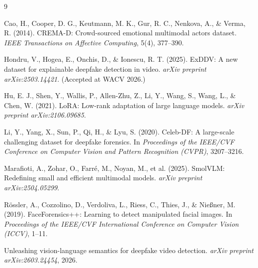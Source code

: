 \documentclass[acmsmall,review=false]{acmart}
\begin{document}
\begin{thebibliography}{9}

Cao, H., Cooper, D. G., Keutmann, M. K., Gur, R. C., Nenkova, A., \& Verma, R. (2014).
CREMA-D: Crowd-sourced emotional multimodal actors dataset.
\textit{IEEE Transactions on Affective Computing}, 5(4), 377--390.

Hondru, V., Hogea, E., Onchis, D., \& Ionescu, R. T. (2025).
ExDDV: A new dataset for explainable deepfake detection in video.
\textit{arXiv preprint arXiv:2503.14421}. (Accepted at WACV 2026.)

Hu, E. J., Shen, Y., Wallis, P., Allen-Zhu, Z., Li, Y., Wang, S., Wang, L., \& Chen, W. (2021).
LoRA: Low-rank adaptation of large language models.
\textit{arXiv preprint arXiv:2106.09685}.

Li, Y., Yang, X., Sun, P., Qi, H., \& Lyu, S. (2020).
Celeb-DF: A large-scale challenging dataset for deepfake forensics.
In \textit{Proceedings of the IEEE/CVF Conference on Computer Vision and Pattern Recognition (CVPR)}, 3207--3216.

Marafioti, A., Zohar, O., Farr\'e, M., Noyan, M., et al. (2025).
SmolVLM: Redefining small and efficient multimodal models.
\textit{arXiv preprint arXiv:2504.05299}.

R\"ossler, A., Cozzolino, D., Verdoliva, L., Riess, C., Thies, J., \& Nie{\ss}ner, M. (2019).
FaceForensics++: Learning to detect manipulated facial images.
In \textit{Proceedings of the IEEE/CVF International Conference on Computer Vision (ICCV)}, 1--11.

Unleashing vision-language semantics for deepfake video detection.
\textit{arXiv preprint arXiv:2603.24454}, 2026.

\end{thebibliography}
\end{document}
